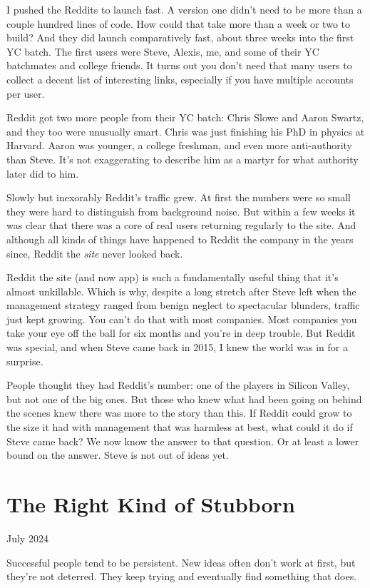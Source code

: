 \documentclass[12pt]{book}
\begin{document}
I pushed the Reddits to launch fast. A version one didn't need to be
more than a couple hundred lines of code. How could that take more than
a week or two to build? And they did launch comparatively fast, about
three weeks into the first YC batch. The first users were Steve, Alexis,
me, and some of their YC batchmates and college friends. It turns out
you don't need that many users to collect a decent list of interesting
links, especially if you have multiple accounts per user.

Reddit got two more people from their YC batch: Chris Slowe and Aaron
Swartz, and they too were unusually smart. Chris was just finishing his
PhD in physics at Harvard. Aaron was younger, a college freshman, and
even more anti-authority than Steve. It's not exaggerating to describe
him as a martyr for what authority later did to him.

Slowly but inexorably Reddit's traffic grew. At first the numbers were
so small they were hard to distinguish from background noise. But within
a few weeks it was clear that there was a core of real users returning
regularly to the site. And although all kinds of things have happened to
Reddit the company in the years since, Reddit the \emph{site} never
looked back.

Reddit the site (and now app) is such a fundamentally useful thing that
it's almost unkillable. Which is why, despite a long stretch after Steve
left when the management strategy ranged from benign neglect to
spectacular blunders, traffic just kept growing. You can't do that with
most companies. Most companies you take your eye off the ball for six
months and you're in deep trouble. But Reddit was special, and when
Steve came back in 2015, I knew the world was in for a surprise.

People thought they had Reddit's number: one of the players in Silicon
Valley, but not one of the big ones. But those who knew what had been
going on behind the scenes knew there was more to the story than this.
If Reddit could grow to the size it had with management that was
harmless at best, what could it do if Steve came back? We now know the
answer to that question. Or at least a lower bound on the answer. Steve
is not out of ideas yet.
\chapter{The Right Kind of Stubborn}

July 2024

Successful people tend to be persistent. New ideas often don't work at
first, but they're not deterred. They keep trying and eventually find
something that does.
\end{document}
